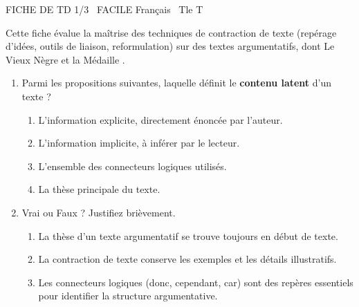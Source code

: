 \documentclass[11pt]{article}
\begin{document}
\begin{tcolorbox}[enhanced,colback=popink,colframe=popink,arc=10pt,boxrule=0pt,left=12pt,right=12pt,top=9pt,bottom=9pt]
{\color{white}\popxbold\small FICHE DE TD 1/3 \textbullet\ FACILE \hfill Français \textbullet\ Tle T\par}
\end{tcolorbox}
\vspace{4pt}

\noindent Cette fiche évalue la maîtrise des techniques de contraction de texte (repérage d'idées, outils de liaison, reformulation) sur des textes argumentatifs, dont \og Le Vieux Nègre et la Médaille \fg{}.

\begin{exercice}
\begin{enumerate}
    \item Parmi les propositions suivantes, laquelle définit le \textbf{contenu latent} d'un texte ?
    \begin{enumerate}
        \item L'information explicite, directement énoncée par l'auteur.
        \item L'information implicite, à inférer par le lecteur.
        \item L'ensemble des connecteurs logiques utilisés.
        \item La thèse principale du texte.
    \end{enumerate}
    \item Vrai ou Faux ? Justifiez brièvement.
    \begin{enumerate}
        \item La thèse d'un texte argumentatif se trouve toujours en début de texte.
        \item La contraction de texte conserve les exemples et les détails illustratifs.
        \item Les connecteurs logiques (donc, cependant, car) sont des repères essentiels pour identifier la structure argumentative.
    \end{enumerate}
\end{enumerate}
\end{exercice}
\end{document}
